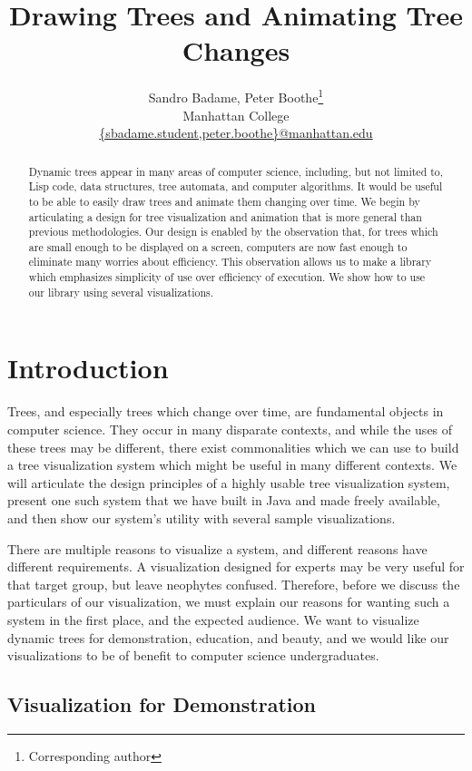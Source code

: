\documentclass{article}
\title{Drawing Trees and Animating Tree Changes}
\author{Sandro Badame, Peter Boothe\footnote{Corresponding author}\\
 Manhattan College\\
\url{{sbadame.student,peter.boothe}@manhattan.edu}}
\begin{document}
\maketitle

\begin{abstract} Dynamic trees appear in many areas of computer science,
including, but not limited to, Lisp code, data structures, tree automata, and
computer algorithms.  It would be useful to be able to easily draw trees and
animate them changing over time.  We begin by articulating a design for tree
visualization and animation that is more general than previous methodologies.
Our design is enabled by the observation that, for trees which are small enough
to be displayed on a screen, computers are now fast enough to eliminate many
worries about efficiency.  This observation allows us to make a library which
emphasizes simplicity of use over efficiency of execution.  We show how to use  our
library using several visualizations.\end{abstract}

\section{Introduction}
Trees, and especially trees which change over time, are fundamental objects in
computer science.  They occur in many disparate contexts, and while the uses of
these trees may be different, there exist commonalities which we can use to
build a tree visualization system which might be useful in many different
contexts.  We will articulate the design principles of a highly usable
tree visualization system, present one such system that we have built in Java
and made freely available, and then show our system's utility with
several sample visualizations.

There are multiple reasons to visualize a system, and different reasons have
different requirements.  A visualization designed for experts may be very
useful for that target group, but leave neophytes confused.  Therefore, before
we discuss the particulars of our visualization, we must explain our reasons
for wanting such a system in the first place, and the expected audience.  We
want to visualize dynamic trees for demonstration, education, and beauty, and
we would like our visualizations to be of benefit to computer science
undergraduates.

\subsection{Visualization for Demonstration}
\end{document}
